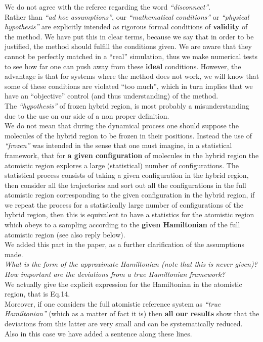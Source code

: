 \documentclass[12pt,a4paper]{article}
\begin{document}
We do not agree with the referee regarding the word {\it ``disconnect''}.\\
Rather than {\it ``ad hoc assumptions''}, our {\it ``mathematical conditions''} or {\it ``physical hypothesis''}
are explicitly intended as rigorous formal conditions of {\bf validity} of the method. We have put this in clear terms, because we say that in order to be justified,
the method should fulfill the conditions given. We are aware that they cannot be perfectly matched in a ``real'' simulation, thus we make numerical tests to see how far one can push away from these {\bf ideal} conditions.
However, the advantage is that for systems where the method does not work, we will know that some of these conditions are violated ``too much'', which in turn implies that we have an ``objective'' control (and thus understanding) of the method.\\
The {\it ``hypothesis''} of frozen hybrid region, is most probably a misunderstanding due to the use on our side of a non proper definition.\\
We do not mean that during the dynamical process one should suppose the molecules of the hybrid region to be frozen in their positions. Instead the use of {\it ``frozen''} was intended in the sense that one must imagine, in a statistical framework, that for {\bf a given configuration} of molecules in the hybrid region the atomistic region explores a large (statistical) number of configurations. The statistical process consists of taking a given configuration in the hybrid region, then consider all the trajectories and sort out all the configurations in the full atomistic region corresponding to the given configuration in the hybrid region, if we repeat the process for a statistically large number of configurations of the hybrid region, then this is equivalent to have a statistics for the atomistic region which obeys to a sampling according to the {\bf given Hamiltonian} of the full atomistic region (see also reply below).\\
We added this part in the paper, as a further clarification of the assumptions made.\\

{\color{teal} {\it What is the form of the approximate Hamiltonian (note that
this is never given)? How important are the deviations from a true Hamiltonian framework?}}\\

We actually give the explicit expression for the Hamiltonian in the atomistic region,
that is Eq.14.\\
Moreover, if one considers the full atomistic reference system as {\it ``true Hamiltonian''} (which as a matter of fact it is) then {\bf all our results} show that the deviations from this latter are very small and 
can be systematically reduced.\\
Also in this case we have added a sentence along these lines.\\
\end{document}
